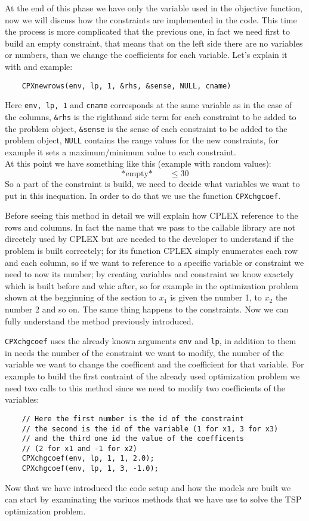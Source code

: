 At the end of this phase we have only the variable used in the objective function, now we will discuss how the constraints are implemented in the code. This time the process is more complicated that the previous one, in fact we need first to build an empty constraint, that means that on the left side there are no variables or numbers, than we change the coefficients for each variable. Let's explain it with and example:

\begin{lstlisting}
	CPXnewrows(env, lp, 1, &rhs, &sense, NULL, cname)
\end{lstlisting}

Here \verb|env, lp, 1| and \verb|cname| corresponds at the same variable as in the case of the columns, \verb|&rhs| is the righthand side term for each constraint to be added to the problem object, \verb|&sense| is the sense of each constraint to be added to the problem object, \verb|NULL| contains the range values for the new constraints, for example it sets a maximum/minimum value to each constraint.\\
At this point we have something like this (example with random values):
\[ \text{*empty*} \qquad \le 30\]
So a part of the constraint is build, we need to decide what variables we want to put in this inequation. In order to do that we use the function \verb|CPXchgcoef|. 

Before seeing this method in detail we will explain how CPLEX reference to the rows and columns. In fact the name that we pass to the callable library are not directely used by CPLEX but are needed to the developer to understand if the problem is built correctely; for its function CPLEX simply enumerates each row and each column, so if we want to reference to a specific variable or constraint we need to now its number; by creating variables and constraint we know exactely which is built before and whic after, so for example in the optimization problem shown at the begginning of the section to $x_1$ is given the number 1, to $x_2$ the number 2 and so on. The same thing happens to the constraints. Now we can fully understand the method previously introduced.

\verb|CPXchgcoef| uses the already known arguments \verb|env| and \verb|lp|, in addition to them in needs the number of the constraint we want to modify, the number of the variable we want to change the coefficent and the coefficient for that variable. For example to build the first contraint of the already used optimization problem we need two calls to this method since we need to modify two coefficients of the variables:

\begin{lstlisting}
	// Here the first number is the id of the constraint
	// the second is the id of the variable (1 for x1, 3 for x3)
	// and the third one id the value of the coefficents
	// (2 for x1 and -1 for x2)
	CPXchgcoef(env, lp, 1, 1, 2.0);
	CPXchgcoef(env, lp, 1, 3, -1.0);
\end{lstlisting}

Now that we have introduced the code setup and how the models are built we can start by examinating the variuos methods that we have use to solve the TSP optimization problem.